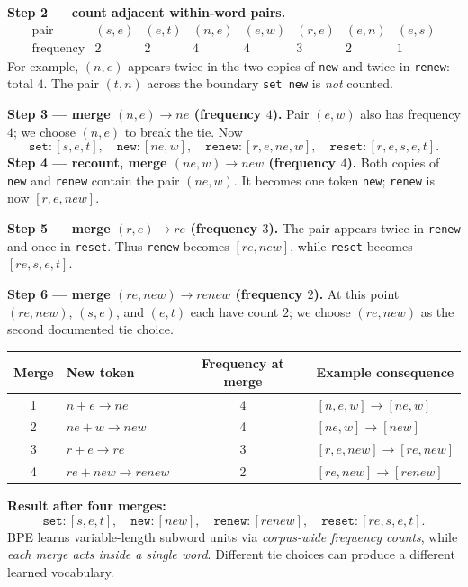\textbf{Step 2 --- count adjacent within-word pairs.}
\[
\begin{array}{c|rrrrrrr}
\text{pair}&(s,e)&(e,t)&(n,e)&(e,w)&(r,e)&(e,n)&(e,s)\\\hline
\text{frequency}&2&2&4&4&3&2&1
\end{array}
\]
For example, $(n,e)$ appears twice in the two copies of \texttt{new} and twice in \texttt{renew}: total $4$. The pair $(t,n)$ across the boundary \texttt{set new} is \emph{not} counted.

\textbf{Step 3 --- merge $(n,e)\to ne$ (frequency $4$).} Pair $(e,w)$ also has frequency $4$; we choose $(n,e)$ to break the tie. Now
\[
\texttt{set}:[s,e,t],\quad\texttt{new}:[ne,w],\quad
\texttt{renew}:[r,e,ne,w],\quad\texttt{reset}:[r,e,s,e,t].
\]
\textbf{Step 4 --- recount, merge $(ne,w)\to new$ (frequency $4$).} Both copies of \texttt{new} and \texttt{renew} contain the pair $(ne,w)$. It becomes one token \texttt{new}; \texttt{renew} is now $[r,e,new]$.

\textbf{Step 5 --- merge $(r,e)\to re$ (frequency $3$).} The pair appears twice in \texttt{renew} and once in \texttt{reset}. Thus \texttt{renew} becomes $[re,new]$, while \texttt{reset} becomes $[re,s,e,t]$.

\textbf{Step 6 --- merge $(re,new)\to renew$ (frequency $2$).} At this point $(re,new)$, $(s,e)$, and $(e,t)$ each have count $2$; we choose $(re,new)$ as the second documented tie choice.
\begin{center}\small
\begin{tabular}{@{}clcl@{}}\toprule
Merge & New token & Frequency at merge & Example consequence\\\midrule
1 & $n+e\to ne$ & 4 & $[n,e,w]\to[ne,w]$\\
2 & $ne+w\to new$ & 4 & $[ne,w]\to[new]$\\
3 & $r+e\to re$ & 3 & $[r,e,new]\to[re,new]$\\
4 & $re+new\to renew$ & 2 & $[re,new]\to[renew]$\\\bottomrule
\end{tabular}\end{center}
\textbf{Result after four merges:}
\[
\texttt{set}:[s,e,t],\quad\texttt{new}:[new],\quad
\texttt{renew}:[renew],\quad\texttt{reset}:[re,s,e,t].
\]
BPE learns variable-length subword units via \emph{corpus-wide frequency counts}, while \emph{each merge acts inside a single word}. Different tie choices can produce a different learned vocabulary.
